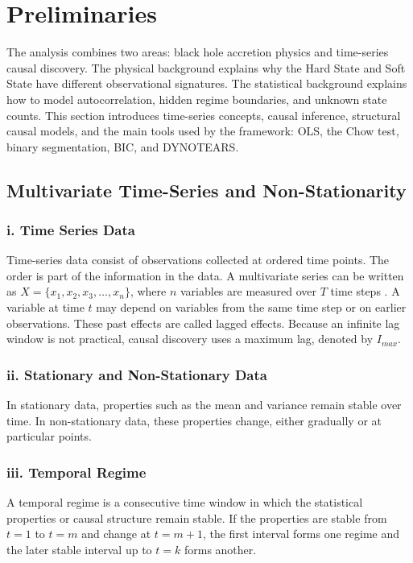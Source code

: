 \section{Preliminaries}
The analysis combines two areas: black hole accretion physics and time-series causal discovery. The physical background explains why the Hard State and Soft State have different observational signatures. The statistical background explains how to model autocorrelation, hidden regime boundaries, and unknown state counts. This section introduces time-series concepts, causal inference, structural causal models, and the main tools used by the framework: OLS, the Chow test, binary segmentation, BIC, and DYNOTEARS.

\subsection{Multivariate Time-Series and Non-Stationarity}

\subsubsection*{i. Time Series Data}

Time-series data consist of observations collected at ordered time points. The order is part of the information in the data. A multivariate series can be written as $X = \{x_1, x_2, x_3, \dots, x_n\}$, where $n$ variables are measured over $T$ time steps \cite{assaad2022survey}. A variable at time $t$ may depend on variables from the same time step or on earlier observations. These past effects are called lagged effects. Because an infinite lag window is not practical, causal discovery uses a maximum lag, denoted by $I_{max}$.

\subsubsection*{ii. Stationary and Non-Stationary Data}

In stationary data, properties such as the mean and variance remain stable over time. In non-stationary data, these properties change, either gradually or at particular points.

\subsubsection*{iii. Temporal Regime}

A temporal regime is a consecutive time window in which the statistical properties or causal structure remain stable. If the properties are stable from $t=1$ to $t=m$ and change at $t=m+1$, the first interval forms one regime and the later stable interval up to $t=k$ forms another.

